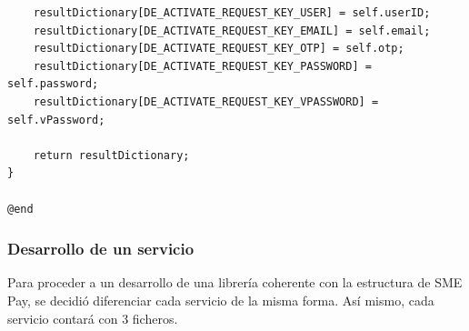 \documentclass[a4paper, 12pt]{article}
\newenvironment{code}{\captionsetup{type=listing}}{}
\begin{document}
\begin{code}
\begin{verbatim}
    resultDictionary[DE_ACTIVATE_REQUEST_KEY_USER] = self.userID;
    resultDictionary[DE_ACTIVATE_REQUEST_KEY_EMAIL] = self.email;
    resultDictionary[DE_ACTIVATE_REQUEST_KEY_OTP] = self.otp;
    resultDictionary[DE_ACTIVATE_REQUEST_KEY_PASSWORD] = self.password;
    resultDictionary[DE_ACTIVATE_REQUEST_KEY_VPASSWORD] = self.vPassword;

    return resultDictionary;
}

@end

\end{verbatim}
\end{code}
\bigbreak
\subsubsection{Desarrollo de un servicio}
\label{sec-4-2-3}
Para proceder a un desarrollo de una librería coherente con la estructura de SME Pay, se decidió diferenciar cada servicio de la misma forma. Así mismo, cada servicio contará con 3 ficheros.
\end{document}
